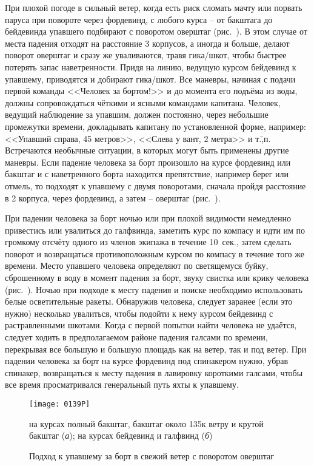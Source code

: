 При плохой погоде в сильный ветер, когда есть риск сломать мачту или
порвать паруса при повороте через фордевинд, с любого курса \--- от
бакштага до бейдевинда упавшего подбирают с поворотом оверштаг
(рис.~). В этом случае от места падения отходят на расстояние
3 корпусов, а иногда и больше, делают поворот оверштаг и сразу
же уваливаются, травя гика\-/шкот, чтобы быстрее потерять запас
наветренности. Придя на линию, ведущую курсом бейдевинд к упавшему,
приводятся и добирают гика\-/шкот. Все маневры, начиная с подачи
первой команды <<Человек за бортом!>> и до момента его подъёма из
воды, должны сопровождаться чёткими и ясными командами
капитана. Человек, ведущий наблюдение за упавшим, должен постоянно,
через небольшие промежутки времени, докладывать капитану по
установленной форме, например: <<Упавший справа, 45 метров>>,
<<Слева у вант, 2 метра>> и т.\=,п. Встречаются необычные ситуации, в
которых могут быть применены другие маневры. Если падение человека за
борт произошло на курсе фордевинд или бакштаг и с наветренного борта
находится препятствие, например берег или отмель, то подходят к
упавшему с двумя поворотами, сначала пройдя расстояние в 2
корпуса, через фордевинд, а затем \--- оверштаг (рис.~).

При падении человека за борт ночью или при плохой видимости немедленно
привестись или увалиться до галфвинда, заметить курс по компасу и идти
им по громкому отсчёту одного из членов экипажа в течение 10~сек., затем сделать поворот и возвращаться противоположным курсом
по компасу в течение того же времени. Место упавшего человека
определяют по светящемуся буйку, сброшенному в воду в момент падения
за борт, звуку свистка или крику человека (рис.~). Ночью при
подходе к месту падения и поиске необходимо использовать белые
осветительные ракеты. Обнаружив человека, следует заранее (если это
нужно) несколько увалиться, чтобы подойти к нему курсом бейдевинд с
растравленными шкотами. Когда с первой попытки найти человека не
удаётся, следует ходить в предполагаемом районе падения галсами по
времени, перекрывая все большую и большую площадь как на ветер, так и
под ветер. При падении человека за борт на курсе фордевинд под
спинакером нужно, убрав спинакер, возвращаться к месту падения в
лавировку короткими галсами, чтобы все время просматривался
генеральный путь яхты к упавшему.

\begin{figure*}[htb]
  \centering{}
  \texttt{[image: 0139P]}
  \caption{Подход к упавшему за борт в свежий ветер с поворотом оверштаг}
  \label{fig:139}
  \small
  \centering{}
  на курсах полный бакштаг, бакштаг около 135\gr к ветру и крутой бакштаг (\textit{а}); на курсах бейдевинд и галфвинд (\textit{б})
\end{figure*}

